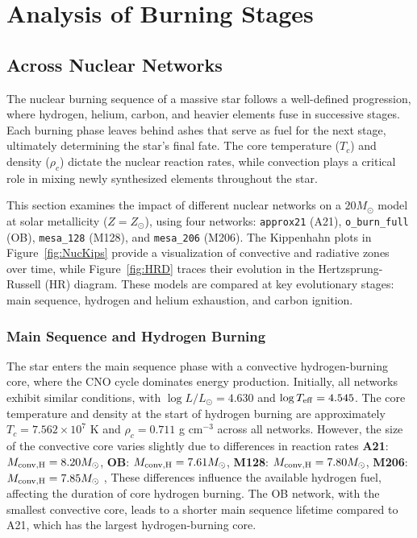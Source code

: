 \section{Analysis of Burning Stages}
\subsection{Across Nuclear Networks}

The nuclear burning sequence of a massive star follows a well-defined progression, where hydrogen, helium, carbon, and heavier elements fuse in successive stages. Each burning phase leaves behind ashes that serve as fuel for the next stage, ultimately determining the star's final fate. The core temperature ($T_c$) and density ($\rho_c$) dictate the nuclear reaction rates, while convection plays a critical role in mixing newly synthesized elements throughout the star.

\vspace{1em}
\noindent
This section examines the impact of different nuclear networks on a $20 M_\odot$ model at solar metallicity ($Z = Z_\odot$), using four networks: \texttt{approx21} (A21), \texttt{o\_burn\_full} (OB), \texttt{mesa\_128} (M128), and \texttt{mesa\_206} (M206). The Kippenhahn plots in Figure~\ref{fig:NucKips} provide a visualization of convective and radiative zones over time, while Figure~\ref{fig:HRD} traces their evolution in the Hertzsprung-Russell (HR) diagram. These models are compared at key evolutionary stages: main sequence, hydrogen and helium exhaustion, and carbon ignition.

\subsubsection{Main Sequence and Hydrogen Burning}

The star enters the main sequence phase with a convective hydrogen-burning core, where the CNO cycle dominates energy production. Initially, all networks exhibit similar conditions, with \(\log L / L_\odot = 4.630\) and \(\log T_{\rm eff} = 4.545\). The core temperature and density at the start of hydrogen burning are approximately $T_c = 7.562 \times 10^7$ K and $\rho_c = 0.711$ g cm$^{-3}$ across all networks. However, the size of the convective core varies slightly due to differences in reaction rates \textbf{A21}: $M_{\rm conv, H} = 8.20 M_\odot$, \textbf{OB}: $M_{\rm conv, H} = 7.61 M_\odot$, \textbf{M128}: $M_{\rm conv, H} = 7.80 M_\odot$, \textbf{M206}: $M_{\rm conv, H} = 7.85 M_\odot$ , These differences influence the available hydrogen fuel, affecting the duration of core hydrogen burning. The OB network, with the smallest convective core, leads to a shorter main sequence lifetime compared to A21, which has the largest hydrogen-burning core.

